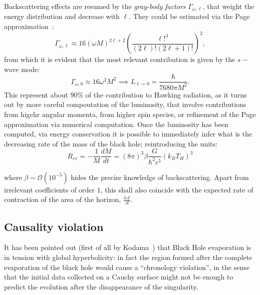 Backscattering effects are resumed by the \emph{gray-body factors} \(\Gamma_{\omega, \ell}\), that weight the energy distribution and decrease with \(\ell\). They could be estimated via the Page approximation~\cite[]{page1976particle}:
\[
	\Gamma_{\omega,\ell} \approx 16(\omega M)^{2\ell + 2}\left(\frac{\ell!^3}{(2\ell)!(2\ell + 1)!}\right)^2,
\]
from which it is evident that the most relevant contribution is given by the \(s-\)wave mode:
\[
\Gamma_{\omega, 0} \approx 16\omega^2M^2 \implies L_{\ell = 0} = \frac{\hbar}{7680\pi M^2}.
\]
This represent about \(90\%\) of the contribution to Hawking radiation, as it turns out by more careful compoutation of the luminosity, that involve contributions from higehr angular momenta, from higher spin species, or refinement of the Page approximation via numerical computation.
Once the luminosity has been computed, via energy conservation it is possible to immediately infer what is the decreasing rate of the mass of the black hole; reintroducing the units:
\begin{equation}
	\label{eq:evaporation-rate}
	R_{ev} = -\frac{1}{M}\frac{dM}{dt} = (8\pi)^3\beta \frac{G}{\hbar^2c^5}\left(k_BT_H\right)^3
\end{equation}

where \(\beta \sim \mathcal{O}(10^{-5})\) hides the precise knowledge of backscattering. Apart from irrelevant coefficients of order \(1\), this shall also coincide with the expected rate of contraction of the area of the horizon, \(\frac{\delta\mathcal{A}}{\mathcal{A}}\).


\subsection{Causality violation}
\label{subsec:causaliy-bh-evaporation}
It has been pointed out (first of all by Kodama~\cite{Kodama:1979vm}) that Black Hole evaporation is in tension with global hyperbolicity: in fact the region formed after the complete evaporation of the black hole would cause a ``chronology violation'', in the sense that the initial data collected on a Cauchy surface might not be enough to predict the evolution after the disappearance of the singularity.

